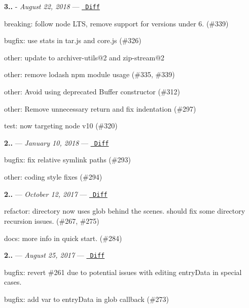 {\bfseries{3..}} -\/ 
\footnotesize {\itshape August 22, 2018}
\normalsize  — \href{https://github.com/archiverjs/node-archiver/compare/2.1.1...3.0.0}{\texttt{ Diff}}


\begin{DoxyItemize}
\item breaking\+: follow node LTS, remove support for versions under 6. (\#339)
\item bugfix\+: use stats in tar.\+js and core.\+js (\#326)
\item other\+: update to archiver-\/utils@2 and zip-\/stream@2
\item other\+: remove lodash npm module usage (\#335, \#339)
\item other\+: Avoid using deprecated Buffer constructor (\#312)
\item other\+: Remove unnecessary return and fix indentation (\#297)
\item test\+: now targeting node v10 (\#320)
\end{DoxyItemize}

{\bfseries{2..}} — 
\footnotesize {\itshape January 10, 2018}
\normalsize  — \href{https://github.com/archiverjs/node-archiver/compare/2.1.0...2.1.1}{\texttt{ Diff}}


\begin{DoxyItemize}
\item bugfix\+: fix relative symlink paths (\#293)
\item other\+: coding style fixes (\#294)
\end{DoxyItemize}

{\bfseries{2..}} — 
\footnotesize {\itshape October 12, 2017}
\normalsize  — \href{https://github.com/archiverjs/node-archiver/compare/2.0.3...2.1.0}{\texttt{ Diff}}


\begin{DoxyItemize}
\item refactor\+: {\ttfamily directory} now uses glob behind the scenes. should fix some directory recursion issues. (\#267, \#275)
\item docs\+: more info in quick start. (\#284)
\end{DoxyItemize}

{\bfseries{2..}} — 
\footnotesize {\itshape August 25, 2017}
\normalsize  — \href{https://github.com/archiverjs/node-archiver/compare/2.0.2...2.0.3}{\texttt{ Diff}}


\begin{DoxyItemize}
\item bugfix\+: revert \#261 due to potential issues with editing entry\+Data in special cases.
\item bugfix\+: add var to entry\+Data in glob callback (\#273)
\end{DoxyItemize}

